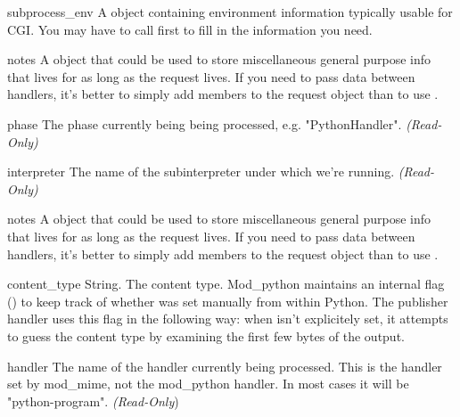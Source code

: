 \begin{memberdesc}[Request]{subprocess_env}
A  object containing environment information typically usable for CGI.
You may have to call  first to fill in the information
you need.
\end{memberdesc}

\begin{memberdesc}[Request]{notes}
A  object that could be used to store miscellaneous
general purpose info that lives for as long as the request lives. If
you need to pass data between handlers, it's better to simply add
members to the request object than to use .
\end{memberdesc}

\begin{memberdesc}[Request]{phase}
The phase currently being being processed, e.g. "PythonHandler".
\emph{(Read-Only)}
\end{memberdesc}

\begin{memberdesc}[Request]{interpreter}
The name of the subinterpreter under which we're running.
\emph{(Read-Only)}
\end{memberdesc}

\begin{memberdesc}[Request]{notes}
A  object that could be used to store miscellaneous
general purpose info that lives for as long as the request lives. If
you need to pass data between handlers, it's better to simply add
members to the request object than to use .
\end{memberdesc}

\begin{memberdesc}[Request]{content_type}
String. The content type. Mod_python maintains an internal flag
() to keep track of whether
 was set manually from within Python. The
publisher handler uses this flag in the following way: when
 isn't explicitely set, it attempts to guess the
content type by examining the first few bytes of the output.
\end{memberdesc}

\begin{memberdesc}[Request]{handler}
The name of the handler currently being processed. This is the handler
set by mod_mime, not the mod_python handler. In most cases it will be
"python-program". \emph{(Read-Only})
\end{memberdesc}

